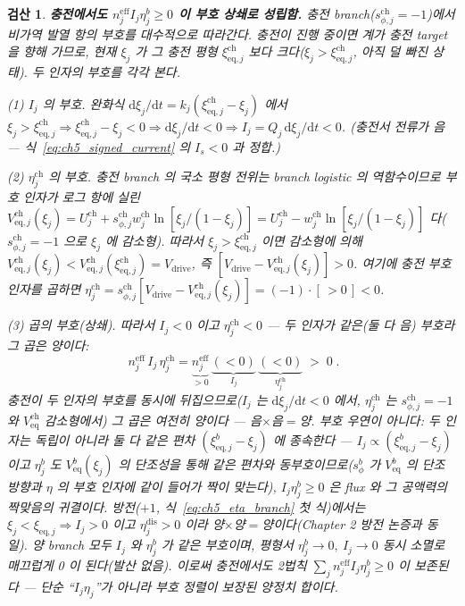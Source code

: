 \documentclass[11pt,a4paper]{article}
\newtheorem*{verifybox}{검산}
\newcommand{\dd}{\mathrm{d}}
\newcommand{\eff}{\mathrm{eff}}
\newcommand{\eq}{\mathrm{eq}}
\newcommand{\drive}{\mathrm{drive}}
\newcommand{\dis}{\mathrm{dis}}
\newcommand{\chg}{\mathrm{ch}}
\begin{document}
\begin{verifybox}
\textbf{충전에서도 $n_j^{\eff}I_j\eta_j^b\ge0$ 이 부호 상쇄로 성립함.} 충전 branch($s_{\phi,j}^\chg=-1$)에서
비가역 발열 항의 부호를 대수적으로 따라간다. 충전이 진행 중이면 계가 충전 target 을 향해 가므로, 현재 $\xi_j$ 가
그 충전 평형 $\xi_{\eq,j}^\chg$ 보다 \emph{크다}($\xi_j>\xi_{\eq,j}^\chg$, 아직 덜 빠진 상태). 두 인자의 부호를
각각 본다.

\emph{(1) $I_j$ 의 부호.} 완화식 $\dd\xi_j/\dd t=k_j(\xi_{\eq,j}^\chg-\xi_j)$ 에서 $\xi_j>\xi_{\eq,j}^\chg\Rightarrow
\xi_{\eq,j}^\chg-\xi_j<0\Rightarrow\dd\xi_j/\dd t<0\Rightarrow I_j=Q_j\,\dd\xi_j/\dd t<0$. (충전서 전류가 음 —
식~\eqref{eq:ch5_signed_current} 의 $I_s<0$ 과 정합.)

\emph{(2) $\eta_j^\chg$ 의 부호.} 충전 branch 의 국소 평형 전위는 branch logistic 의 \emph{역함수}이므로 부호
인자가 로그 항에 실린 $V_{\eq,j}^\chg(\xi_j)=U_j^\chg+s_{\phi,j}^\chg w_j^\chg\ln[\xi_j/(1-\xi_j)]
=U_j^\chg-w_j^\chg\ln[\xi_j/(1-\xi_j)]$ 다($s_{\phi,j}^\chg=-1$ 으로 $\xi_j$ 에 \emph{감소}형). 따라서
$\xi_j>\xi_{\eq,j}^\chg$ 이면 감소형에 의해 $V_{\eq,j}^\chg(\xi_j)<V_{\eq,j}^\chg(\xi_{\eq,j}^\chg)=V_\drive$, 즉
$[V_\drive-V_{\eq,j}^\chg(\xi_j)]>0$. 여기에 충전 부호 인자를 곱하면 $\eta_j^\chg=s_{\phi,j}^\chg[V_\drive
-V_{\eq,j}^\chg(\xi_j)]=(-1)\cdot[\,>0\,]<0$.

\emph{(3) 곱의 부호(상쇄).} 따라서 $I_j<0$ \emph{이고} $\eta_j^\chg<0$ — 두 인자가 같은(둘 다 음) 부호라 그
곱은 양이다:
\begin{equation}
\boxed{\;n_j^{\eff}\,I_j\,\eta_j^\chg=\underbrace{n_j^{\eff}}_{>0}\,\underbrace{(<0)}_{I_j}\,\underbrace{(<0)}_{\eta_j^\chg}\;>\;0\;.}
\label{eq:ch5_qirr_charge}
\end{equation}
충전이 \emph{두 인자의 부호를 동시에} 뒤집으므로($I_j$ 는 $\dd\xi_j/\dd t<0$ 에서, $\eta_j^\chg$ 는
$s_{\phi,j}^\chg=-1$ \emph{와} $V_{\eq}^\chg$ 감소형에서) 그 곱은 여전히 양이다 — 음$\times$음$=$양. 부호 우연이
아니다: 두 인자는 독립이 아니라 둘 다 같은 편차 $(\xi_{\eq,j}^b-\xi_j)$ 에 종속한다 — $I_j\propto(\xi_{\eq,j}^b
-\xi_j)$ 이고 $\eta_j^b$ 도 $V_{\eq}^b(\xi_j)$ 의 단조성을 통해 같은 편차와 동부호이므로($s_\phi^b$ 가 $V_{\eq}^b$
의 단조 방향과 $\eta$ 의 부호 인자에 같이 들어가 짝이 맞는다), $I_j\eta_j^b\ge0$ 은 flux 와 그 공액력의 짝맞음의
귀결이다. 방전($+1$, 식~\eqref{eq:ch5_eta_branch} 첫 식)에서는 $\xi_j<\xi_{\eq,j}\Rightarrow I_j>0$ \emph{이고}
$\eta_j^\dis>0$ 이라 양$\times$양$=$양이다(Chapter 2 방전 논증과 동일). 양 branch 모두 $I_j$ 와 $\eta_j^b$ 가 같은
부호이며, 평형서 $\eta_j^b\to0,\ I_j\to0$ 동시 소멸로 매끄럽게 0 이 된다(발산 없음). 이로써 충전에서도 2법칙
$\sum_j n_j^{\eff}I_j\eta_j^b\ge0$ 이 보존된다 — 단순 ``$I_j\eta_j$''가 아니라 부호 정렬이 보장된 양정치 합이다.
\end{verifybox}
\end{document}

